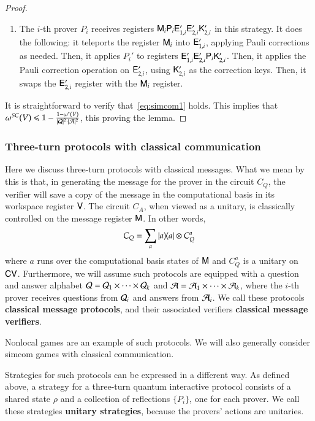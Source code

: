 \begin{proof}
\begin{enumerate}
		\item The $i$-th prover $P_i$ receives registers ${\mathsf{M}}_i {\mathsf{P}}_i {\mathsf{E}}_{1,i}' {\mathsf{E}}_{2,i}' {\mathsf{K}}_{2,i}'$ in this strategy. It does the following: it teleports the register ${\mathsf{M}}_i$ into ${\mathsf{E}}_{1,i}'$, applying Pauli corrections as needed. Then, it applies $P_i'$ to registers ${\mathsf{E}}_{1,i}' {\mathsf{E}}_{2,i}' {\mathsf{P}}_i {\mathsf{K}}_{2,i}'$. Then, it applies the Pauli correction operation on ${\mathsf{E}}_{2,i}'$, using ${\mathsf{K}}_{2,i}'$ as the correction keys. Then, it swaps the ${\mathsf{E}}_{2,i}'$ register with the ${\mathsf{M}}_i$ register. 
	\end{enumerate}
	It is straightforward to verify that~\eqref{eq:simcom1} holds.  This implies that $\omega^{SC}(V) \leqslant 1 - \frac{1 - \omega^*(V)}{|\mathcal Q|^2 \cdot |\mathcal A|^2}$, this proving the lemma.
\end{proof}


\subsubsection{Three-turn protocols with classical communication}


Here we discuss three-turn protocols with classical messages. What we mean by this is that, in generating the message for the prover in the circuit $C_Q$, the verifier will save a copy of the message in the computational basis in its workspace register ${\mathsf{V}}$. The circuit $C_A$, when viewed as a unitary, is classically controlled on the message register ${\mathsf{M}}$. In other words, 
\[
	C_Q = \sum_{a} |a\rangle\! \langle a| \otimes C_Q^a 
\]
where $a$ runs over the computational basis states of ${\mathsf{M}}$ and $C_Q^a$ is a unitary on ${\mathsf{C}} {\mathsf{V}}$. Furthermore, we will assume such protocols are equipped with a question and answer alphabet $\mathcal Q = \mathcal Q_1 \times \cdots \times \mathcal Q_k$ and $\mathcal A = \mathcal A_1 \times \cdots \times \mathcal A_k$, where the $i$-th prover receives questions from $\mathcal Q_i$ and answers from $\mathcal A_i$. We call these protocols \textbf{classical message protocols}, and their associated verifiers \textbf{classical message verifiers}.

Nonlocal games are an example of such protocols. We will also generally consider simcom games with classical communication. 

Strategies for such protocols can be expressed in a different way. As defined above, a strategy for a three-turn quantum interactive protocol consists of a shared state $\rho$ and a collection of reflections $\{ P_i \}$, one for each prover. We call these strategies \textbf{unitary strategies}, because the provers' actions are unitaries.


